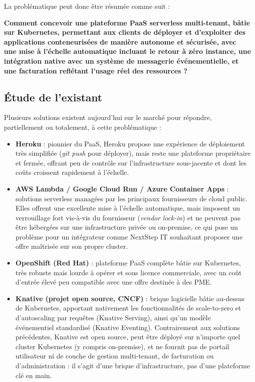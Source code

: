 La problématique peut donc être résumée comme suit :

\begin{center}
\begin{tcolorbox}[colback=white, colframe=black, boxrule=0.6pt, arc=0pt, width=0.9\textwidth]
\centering
\textbf{Comment concevoir une plateforme PaaS serverless multi-tenant, bâtie sur Kubernetes, permettant aux clients de déployer et d'exploiter des applications conteneurisées de manière autonome et sécurisée, avec une mise à l'échelle automatique incluant le retour à zéro instance, une intégration native avec un système de messagerie événementielle, et une facturation reflétant l'usage réel des ressources ?}
\end{tcolorbox}
\end{center}

\subsection{Étude de l'existant}

Plusieurs solutions existent aujourd'hui sur le marché pour répondre, partiellement ou totalement, à cette problématique :

\begin{itemize}
    \item \textbf{Heroku} : pionnier du PaaS, Heroku propose une expérience de déploiement très simplifiée (\textit{git push} pour déployer), mais reste une plateforme propriétaire et fermée, offrant peu de contrôle sur l'infrastructure sous-jacente et dont les coûts croissent rapidement à l'échelle.

    \item \textbf{AWS Lambda / Google Cloud Run / Azure Container Apps} : solutions serverless managées par les principaux fournisseurs de cloud public. Elles offrent une excellente mise à l'échelle automatique, mais imposent un verrouillage fort vis-à-vis du fournisseur (\textit{vendor lock-in}) et ne peuvent pas être hébergées sur une infrastructure privée ou on-premise, ce qui pose un problème pour un intégrateur comme NextStep IT souhaitant proposer une offre maîtrisée sur son propre cluster.

    \item \textbf{OpenShift (Red Hat)} : plateforme PaaS complète bâtie sur Kubernetes, très robuste mais lourde à opérer et sous licence commerciale, avec un coût d'entrée élevé peu compatible avec une offre destinée à des PME.

    \item \textbf{Knative (projet open source, CNCF)} : brique logicielle bâtie au-dessus de Kubernetes, apportant nativement les fonctionnalités de scale-to-zero et d'autoscaling par requêtes (Knative Serving), ainsi qu'un modèle événementiel standardisé (Knative Eventing). Contrairement aux solutions précédentes, Knative est open source, peut être déployé sur n'importe quel cluster Kubernetes (y compris on-premise), et ne fournit pas de portail utilisateur ni de couche de gestion multi-tenant, de facturation ou d'administration : il s'agit d'une brique d'infrastructure, pas d'une plateforme clé en main.
\end{itemize}


